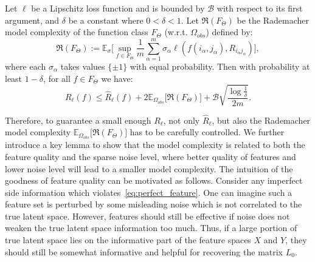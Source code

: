 \documentclass[twoside,11pt]{article}
\def\Obs{\Omega_{obs}}
\newcommand\Ex[2]{{\mathbb E}_{#1}\big[#2\big]}
\def\bmax{{\mathcal B}}
\def\rad{{\mathfrak R}}
\def\realL{L_0}
\begin{document}
\begin{lemma}
\label{lemma:expect_l_risk_2}
Let $\ell$ be a Lipschitz loss function and is bounded by
$\bmax$ with respect to its first argument,
and $\delta$ be a constant where $0 < \delta < 1$.
Let $\rad(F_\Theta)$ be the Rademacher model complexity of the function class
$F_\Theta$ (w.r.t. $\Obs$) defined by:
\begin{equation*}
  \rad(F_\Theta) := \Ex{\sigma}{ \sup_{f \in F_\Theta} \frac{1}{m}
    \sum_{\alpha=1}^m \sigma_{\alpha} \ell(f(i_\alpha, j_\alpha), R_{i_\alpha
        j_\alpha})},
\end{equation*}
where each $\sigma_{\alpha}$ takes values $\{\pm1\}$ with equal probability.
Then with probability at least $1-\delta$, for all $f \in F_\Theta$ we have:
\begin{equation*}
  R_\ell(f) \leq \hat{R}_\ell(f) + 2
  \Ex{\Obs}{\rad(F_\Theta)} + \bmax\sqrt{\frac{\log \frac{1}{\delta}}{2m}}.
\end{equation*}
\end{lemma}
Therefore, to guarantee a small enough $R_\ell$, not only $\hat{R}_\ell$,
but also the Rademacher model complexity $\Ex{\Obs}{\rad(F_\Theta)}$ has to be carefully controlled.
We further introduce a key lemma to show that
the model complexity %
is related to both the feature quality and the sparse noise level, where better quality of features
and lower noise level
will lead to a smaller model complexity. %
The intuition of the goodness of feature quality can be motivated as follows.
Consider any imperfect side information which violates~\eqref{eq:perfect_feature}.  One can imagine such a feature set
is perturbed by some misleading noise which is not correlated to the true latent space.
However, features should still be effective if noise does not weaken the
true latent space information too much.  Thus, if a large portion of true latent
space lies on the informative part of the feature spaces $X$ and $Y$, they
should still be somewhat informative and helpful for recovering the matrix $\realL$.
\end{document}
